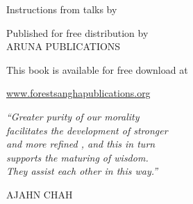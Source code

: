 
{\pagestyle{empty}

{\raggedleft\setlength{\parskip}{1em}\setlength{\parindent}{0em}

\vspace*{4\baselineskip}
{\selectfont\titlepagetitlesize\color{textbody} \MakeUppercase{\bookTitle}%
\par\vspace*{\baselineskip}\vspace*{-0.1\baselineskip} {\titlepageauthorsize Instructions from talks by\linebreak \bookAuthor}}

\vfill

{\selectfont%
Published for free distribution by\\
ARUNA PUBLICATIONS

This book is available for free download at

\vspace*{-0.8\baselineskip}%
{\titlepagelinksize\href{http://www.forestsanghapublications.org/}{www.forestsanghapublications.org}}%

}

}

\mbox{}\newpage\thispagestyle{empty}%


\cleardoublepage

\mbox{}\vspace*{-\headsep}

\noindent%
\begin{minipage}[c][\textheight][c]{\paperwidth}

\noindent\hspace*{-20mm}%
\begin{minipage}{\paperwidth}
\centering

{\itshape ``Greater purity of our morality\\ facilitates the development of stronger\\ and more refined , and this in turn\\ supports the maturing of wisdom.\\ They assist each other in this way.''}
\bigskip

{\smaller\MakeUppercase{Ajahn Chah}}

\end{minipage}

\end{minipage}

\clearpage\thispagestyle{empty}



\cleardoublepage\thispagestyle{empty}

\tableofcontents*

\thispagestyle{empty}


}
